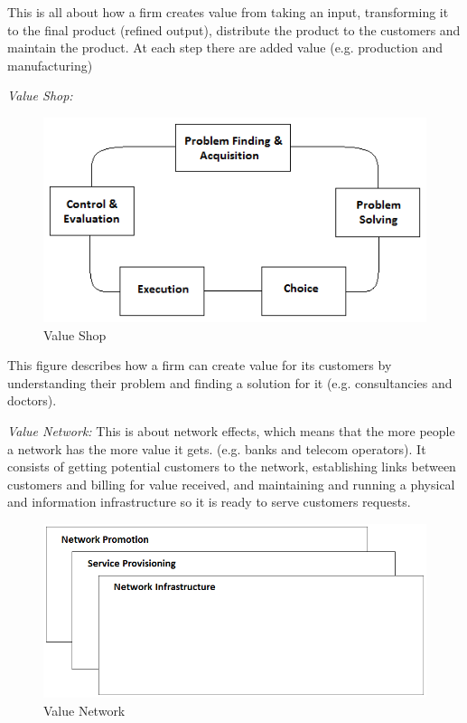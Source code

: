 This is all about how a firm creates value from taking an input, transforming it to the final product (refined output), distribute the product  to the customers and maintain the product. At each step there are added value (e.g. production and manufacturing)

\bigskip

\emph{Value Shop:}


\begin{figure}[h]
\caption[ValueShop]{Value Shop \cite{osterwalderthesis}}
\label{fig:ValueShop}
\begin{center}
\includegraphics[scale=0.8]{valueshop}
\end{center}
\end{figure}

This figure describes how a firm can create value for its customers by understanding their problem and finding a solution for it (e.g. consultancies and doctors).

\newpage

\emph{Value Network:}
This is about network effects, which means that the more people a network has the more value it gets. (e.g. banks and telecom operators). It consists of getting potential customers to the network, establishing links between customers and billing for value received, and maintaining and running a physical and information infrastructure so it is ready to serve customers requests. 

\begin{figure}[h]
\caption[ValueNetwork]{Value Network \cite{osterwalderthesis}}
\label{fig:ValueNetwork}
\begin{center}
\includegraphics[scale=0.5]{valuenetwork}
\end{center}
\end{figure}

